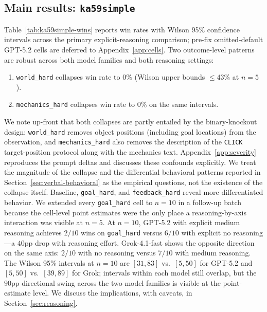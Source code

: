 \documentclass{article}
\begin{document}
\subsection{Main results: \texttt{ka59simple}}
\label{sec:ka59simple}
Table~\ref{tab:ka59simple-wins} reports win rates with Wilson 95\% confidence intervals across the primary explicit-reasoning comparison; pre-fix omitted-default GPT-5.2 cells are deferred to Appendix~\ref{app:cells}. Two outcome-level patterns are robust across both model families and both reasoning settings:
\begin{enumerate}
  \item \texttt{world\_hard} collapses win rate to $0\%$ (Wilson upper bounds $\le 43\%$ at $n=5$).
  \item \texttt{mechanics\_hard} collapses win rate to $0\%$ on the same intervals.
\end{enumerate}
We note up-front that both collapses are partly entailed by the binary-knockout design: \texttt{world\_hard} removes object positions (including goal locations) from the observation, and \texttt{mechanics\_hard} also removes the description of the \texttt{CLICK} target-position protocol along with the mechanics text. Appendix~\ref{app:severity} reproduces the prompt deltas and discusses these confounds explicitly. We treat the magnitude of the collapse and the differential behavioral patterns reported in Section~\ref{sec:verbal-behavioral} as the empirical questions, not the existence of the collapse itself.
Baseline, \texttt{goal\_hard}, and \texttt{feedback\_hard} reveal more differentiated behavior. We extended every \texttt{goal\_hard} cell to $n=10$ in a follow-up batch because the cell-level point estimates were the only place a reasoning-by-axis interaction was visible at $n=5$. At $n=10$, GPT-5.2 with explicit medium reasoning achieves $2/10$ wins on \texttt{goal\_hard} versus $6/10$ with explicit no reasoning---a $40$pp drop with reasoning effort. Grok-4.1-fast shows the opposite direction on the same axis: $2/10$ with no reasoning versus $7/10$ with medium reasoning. The Wilson 95\% intervals at $n=10$ are $[31,83]$ vs.\ $[5,50]$ for GPT-5.2 and $[5,50]$ vs.\ $[39,89]$ for Grok; intervals within each model still overlap, but the $90$pp directional swing across the two model families is visible at the point-estimate level. We discuss the implications, with caveats, in Section~\ref{sec:reasoning}.
\end{document}
